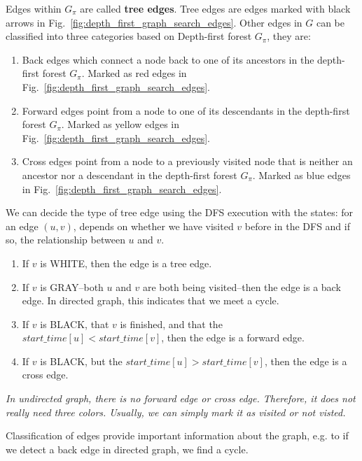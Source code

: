 \documentclass[../main.tex]{subfiles}
\begin{document}
Edges within $G_\pi$ are called \textbf{tree edges}. 
Tree edges are edges marked with black arrows in Fig.~\ref{fig:depth_first_graph_search_edges}. 
Other edges in $G$ can be classified into three categories based on Depth-first forest $G_\pi$, they are:
\begin{enumerate}
\item Back edges which connect a node back to one of its ancestors in the depth-first forest $G_\pi$. 
Marked as red edges in Fig.~\ref{fig:depth_first_graph_search_edges}. 
\item Forward edges point from a node to one of its descendants in the depth-first forest $G_\pi$. Marked as yellow edges in Fig.~\ref{fig:depth_first_graph_search_edges}.
\item Cross edges point from a node to a previously visited node that is neither an ancestor nor a descendant in the depth-first forest $G_\pi$.  Marked as blue edges in Fig.~\ref{fig:depth_first_graph_search_edges}.
\end{enumerate}
We can decide the type of tree edge using the DFS execution with the states: for an edge $(u, v)$,  
depends on whether we have visited $v$ before in the DFS and if so, the relationship between $u$ and $v$.
\begin{enumerate}
  \item If $v$ is WHITE, then the edge is a tree edge.
  \item If $v$ is GRAY--both $u$ and $v$ are both being visited--then the edge is a back edge. 
  In directed graph, this indicates that we meet a cycle. 
  \item If $v$ is BLACK, that $v$ is finished, and that the $start\_time[u] < start\_time[v]$, then the edge is a forward edge.
  \item If $v$ is BLACK, but the $start\_time[u] > start\_time[v]$, then the edge is a cross edge.
\end{enumerate}
\textit{In undirected graph, there is no forward edge or cross edge. Therefore, it does not really need three colors. 
Usually, we can simply mark it as visited or not visted.}

Classification of edges provide important information about the graph, e.g. to if we detect a back edge in directed graph, we find a cycle.
\end{document}
